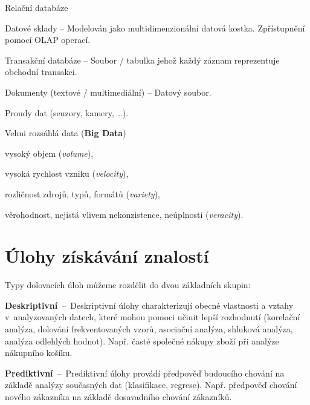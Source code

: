 \begin{compactitem}
    \item Relační databáze
    \item Datové sklady -- Modelován jako multidimenzionální datová kostka. Zpřístupnění pomocí OLAP operací.
    \item Transakční databáze -- Soubor / tabulka jehož každý záznam reprezentuje obchodní transakci.
    \item Dokumenty (textové / multimediální) -- Datový soubor.
    \item Proudy dat (senzory, kamery, \dots).
    \item Velmi rozsáhlá data (\textbf{Big Data}) \begin{compactitem}
        \item vysoký objem (\textit{volume}),
        \item vysoká rychlost vzniku (\textit{velocity}),
        \item rozličnost zdrojů, typů, formátů (\textit{variety}),
        \item věrohodnost, nejistá vlivem nekonzistence, neúplnosti (\textit{veracity}).
    \end{compactitem}
\end{compactitem}


\section{Úlohy získávání znalostí}

\begin{compactitem}
    \item Typy dolovacích úloh můžeme rozdělit do dvou základních skupin:

    \begin{compactitem}
        \item \textbf{Deskriptivní}~--~Deskriptivní úlohy charakterizují obecné vlastnosti a vztahy v~analyzovaných datech, které mohou pomoci učinit lepší rozhodnutí (korelační analýza, dolování frekventovaných vzorů, asociační analýza, shluková analýza, analýza odlehlých hodnot). Např. časté společné nákupy zboží při analýze nákupního košíku.

        \item \textbf{Prediktivní}~--~Prediktivní úlohy provádí předpověď budoucího chování na základě analýzy současných dat (klasifikace, regrese). Např. předpověď chování nového zákazníka na základě dosavadního chování zákazníků.
    \end{compactitem}
\end{compactitem}

